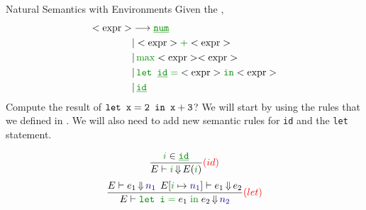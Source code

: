 \begin{example}[Lecture 3]{Natural Semantics with Environments}
  Given the ,
  \begin{align*}
    \Nonterminal{expr} &\longrightarrow \textcolor{Green4}{\underline{\mathtt{num}}} \\
                       &\vert \Nonterminal{expr} \textcolor{Green4}{+} \Nonterminal{expr} \\
                       &\vert \, \textcolor{Green4}{\mathtt{\max}} \Nonterminal{expr} \Nonterminal{expr} \\
                       &\vert \, \textcolor{Green4}{\text{\texttt{let \underline{id}}} = } \Nonterminal{expr} \textcolor{Green4}{\mathtt{in}} \Nonterminal{expr} \\
                       &\vert \, \textcolor{Green4}{\mathtt{\underline{id}}}
  \end{align*}
  Compute the result of $\text{\texttt{let }} \mathtt{x = 2} \text{\texttt{ in }} \mathtt{x+3}$?
  \tcblower{}
  We will start by using the rules that we defined in .
  We will also need to add new semantic rules for \textcolor{Green4}{\texttt{id}} and the \texttt{let} statement.

  \begin{equation*}
    \frac{\textcolor{Green4}{i} \in \textcolor{Green4}{\mathtt{\underline{id}}}}{E \vdash \textcolor{Green4}{i} \EvaluatesTo E(\textcolor{Green4}{i})} \textcolor{red}{(id)}
  \end{equation*}
  \begin{equation*}
    \frac{E \vdash e_{1} \EvaluatesTo \textcolor{Blue4}{n_{1}} \:\: E[\textcolor{Green4}{i} \mapsto \textcolor{Blue4}{n_{1}}] \vdash e_{1} \EvaluatesTo e_{2}}{E \vdash \textcolor{Green4}{\text{\texttt{let }}\mathtt{i =}} \; e_{1} \; \textcolor{Green4}{\mathtt{\text{in}}} \; e_{2} \EvaluatesTo \textcolor{Blue4}{n_{2}}} \textcolor{red}{(let)}
  \end{equation*}


\end{example}
